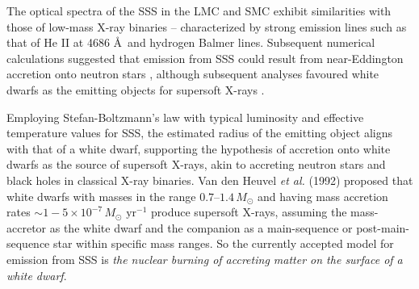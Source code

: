     
    The optical spectra of the SSS in the LMC and SMC exhibit similarities with those of low-mass X-ray binaries -- characterized by strong emission lines such as that of He II at 4686 \AA\ and hydrogen Balmer lines. Subsequent numerical calculations suggested that emission from SSS could result from near-Eddington accretion onto neutron stars \cite{kylafis93}, although subsequent analyses favoured white dwarfs as the emitting objects for supersoft X-rays \cite{van1992accreting}.
    
    Employing Stefan-Boltzmann's law with typical luminosity and effective temperature values for SSS, the estimated radius of the emitting object aligns with that of a white dwarf, supporting the hypothesis of accretion onto white dwarfs as the source of supersoft X-rays, akin to accreting neutron stars and black holes in classical X-ray binaries. Van den Heuvel \textit{et al.} (1992) \cite{van1992accreting} proposed that white dwarfs with masses in the range $0.7–1.4\,M_\odot$ and having mass accretion rates $\sim 1-5\times 10^{-7}\,M_\odot\text{ yr}^{-1}$ produce supersoft X-rays, assuming the mass-accretor as the white dwarf and the companion as a main-sequence or post-main-sequence star within specific mass ranges. %
    So the currently accepted model for emission from SSS is \textit{the nuclear burning of accreting matter on the surface of a white dwarf}.
    
